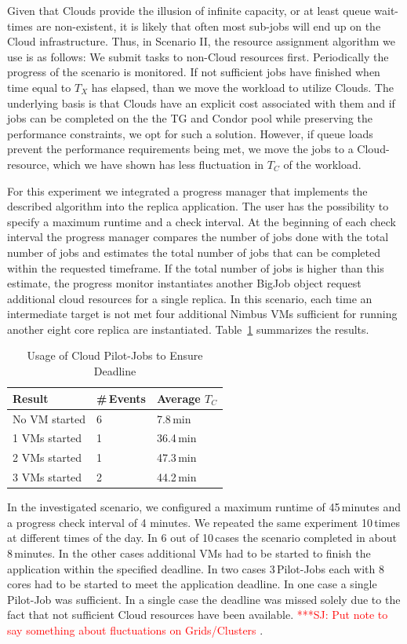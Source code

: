 \documentclass[conference,final]{IEEEtran}
\newcommand{\tmax}{$T_{max}$ }
\newcommand{\tc}{$T_{C}$ }
\newcommand{\jhanote}[1]{ {\textcolor{red} { ***SJ: #1 }}}
\newcommand{\jhanote}[1]{}
\begin{document}
Given that Clouds provide the illusion of infinite capacity, or at
least queue wait-times are non-existent, it is likely that often most
sub-jobs will end up on the Cloud infrastructure.  Thus, in Scenario
II, the resource assignment algorithm we use is as follows: We submit
tasks to non-Cloud resources first. Periodically the progress of the
scenario is monitored. If not sufficient jobs have finished
when time equal to $T_{X}$ has elapsed,
than we move the workload to utilize Clouds.  The
underlying basis is that Clouds have an explicit cost associated with
them and if jobs can be completed on the the TG and Condor pool while
preserving the performance constraints, we opt for such a
solution. However, if queue loads prevent the performance requirements
being met, we move the jobs to a Cloud-resource, which we have shown
has less fluctuation in \tc of the workload.

For this experiment we integrated a progress manager that implements
the described algorithm into the replica application.
The user has the possibility to specify a maximum runtime and a check interval.
At the beginning of each check interval the progress manager compares the number 
of jobs done with the total number of jobs and estimates the total 
number of jobs that can be completed within the requested timeframe. If the total
number of jobs is higher than this estimate, the progress monitor instantiates
another BigJob object request additional cloud resources for a single replica. 
In this scenario, each time an intermediate target is not met four additional 
Nimbus VMs sufficient for running another eight core replica are instantiated.
Table~\ref{tab:app_deadline} summarizes the results.

\begin{table}[ht]
    \centering
	\begin{tabular}{|l|l|l|}
	\hline
    Result & \#\,Events &Average \tc \\ \hline
	No VM started &6 &7.8\,min\\ \hline
	1 VMs started &1 &36.4\,min\\ \hline
	2 VMs started &1 &47.3\,min\\ \hline
	3 VMs started &2 &44.2\,min\\ \hline
	\end{tabular}
	\caption{Usage of Cloud Pilot-Jobs to Ensure Deadline \label{tab:app_deadline}}
\end{table}

In the investigated scenario, we configured a maximum runtime of
45\,minutes and a progress check interval of 4 minutes. We repeated
the same experiment 10\,times at different times of the day. In 6 out
of 10\,cases the scenario completed in about 8\,minutes. In the other
cases additional VMs had to be started to finish the application
within the specified deadline. In two cases 3\,Pilot-Jobs each with 8
cores had to be started to meet the application deadline. In one case
a single Pilot-Job was sufficient. In a single case the deadline was
missed solely due to the fact that not sufficient Cloud resources have
been available. \jhanote{Put note to say something about fluctuations
  on Grids/Clusters}.
\end{document}
